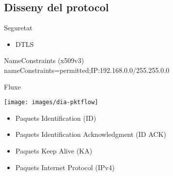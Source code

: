 \subsection{Disseny del protocol}
    \begin{frame}{Seguretat}
        \begin{itemize}
\item DTLS
        \end{itemize}
        \begin{block}{NameConstraints (x509v3)}
        nameConstraints=permitted;IP:192.168.0.0/255.255.0.0
        \end{block}
    \end{frame}
    \begin{frame}{Fluxe}
        \begin{center}
        \texttt{[image: images/dia-pktflow]}
        \end{center}
        \begin{itemize}
\item Paquets Identification (ID)
\item Paquets Identification Acknowledgment (ID ACK)
\item Paquets Keep Alive (KA)
\item Paquets Internet Protocol (IPv4)
        \end{itemize}

    \end{frame}
